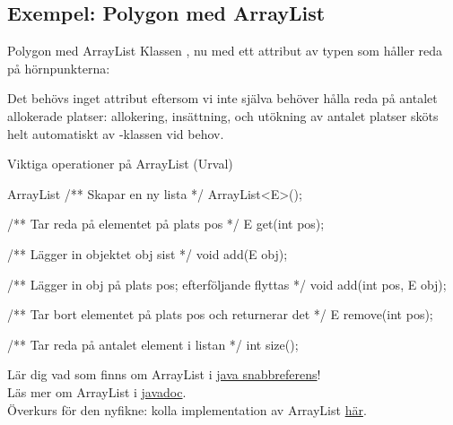 \documentclass{lecturenotes}
\begin{document}
\subsection{Exempel: Polygon med ArrayList}
\begin{Slide}{Polygon med ArrayList}
Klassen , nu med ett attribut av typen  som håller reda på hörnpunkterna:
\begin{Code}[numberstyle=]
public class Polygon {
    private ArrayList<Point> vertices; // lista med hörnpunkter
    
    /** Skapar en polygon */
    public Polygon() {
        vertices = new ArrayList<Point>();
    }
    
    ...
\end{Code}
Det behövs inget attribut  eftersom vi inte själva behöver hålla reda på antalet allokerade platser: allokering, insättning, och utökning av antalet platser sköts helt automatiskt av -klassen vid behov. 
\end{Slide}

\begin{Slide}{Viktiga operationer på ArrayList (Urval)}
\begin{ClassSpec}{ArrayList}
/** Skapar en ny lista */
ArrayList<E>();

/** Tar reda på elementet på plats pos */
E get(int pos);

/** Lägger in objektet obj sist */
void add(E obj);

/** Lägger in obj på plats pos; efterföljande flyttas */
void add(int pos, E obj);

/** Tar bort elementet på plats pos och returnerar det */
E remove(int pos);

/** Tar reda på antalet element i listan */
int size();
\end{ClassSpec}
Lär dig vad som finns om ArrayList i  \href{http://fileadmin.cs.lth.se/cs/Education/EDA016/general/quickref.pdf}{java snabbreferens}! \\
Läs mer om ArrayList i \href{https://docs.oracle.com/javase/8/docs/api/java/util/ArrayList.html}{javadoc}.\\
\footnotesize Överkurs för den nyfikne: kolla implementation av ArrayList \href{http://www.docjar.com/html/api/java/util/ArrayList.java.html}{här}.
\end{Slide}
\end{document}
